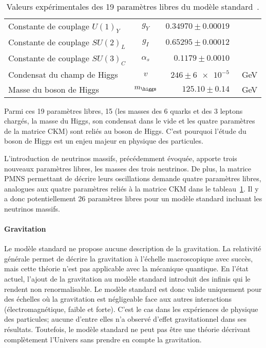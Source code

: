 \begin{table}[h]
\begin{tabular}{lcrl}
Constante de couplage $U(1)_Y$ & $g_Y$ & $\num{0.34970}\pm\num{0.00019}$ & \\
Constante de couplage $SU(2)_L$ & $g_I$ & $\num{0.65295}\pm\num{0.00012}$ & \\
Constante de couplage $SU(3)_C$ & $\alpha_s$ & $\num{0.1179}\pm\num{0.0010}$ & \\
Condensat du champ de Higgs & $v$ & $\num{246}\pm\num{6e-5}$ & \SI{}{\GeV} \\
Masse du boson de Higgs & $m_{\higgs}$ & $\num{125.10}\pm\num{0.14}$ & \SI{}{\GeV} \\
\bottomrule
\end{tabular}
\caption[Valeurs expérimentales des 19 paramètres libres du modèle standard.]{Valeurs expérimentales des 19 paramètres libres du modèle standard~\cite{PDG_booklet_2020}.}
\label{tab-19_free_SM_parameters}
\end{table}
Parmi ces 19 paramètres libres, 15 (les masses des 6 quarks et des 3 leptons chargés, la masse du Higgs, son condensat dans le vide et les quatre paramètres de la matrice CKM) sont reliés au boson de Higgs. C'est pourquoi l'étude du boson de Higgs est un enjeu majeur en physique des particules.
\par L'introduction de neutrinos massifs, précédemment évoquée, apporte trois nouveaux paramètres libres, les masses des trois neutrinos. De plus, la matrice PMNS permettant de décrire leurs oscillations demande quatre paramètres libres, analogues aux quatre paramètres reliés à la matrice CKM dans le tableau~\ref{tab-19_free_SM_parameters}. Il y a donc potentiellement 26 paramètres libres pour un modèle standard incluant les neutrinos massifs.
\paragraph{Gravitation}
Le modèle standard ne propose aucune description de la gravitation.
La relativité générale permet de décrire la gravitation à l'échelle macroscopique avec succès, mais cette théorie n'est pas applicable avec la mécanique quantique.
En l'état actuel, l'ajout de la gravitation au modèle standard introduit des infinis qui le rendent non renormalisable.
Le modèle standard est donc valide uniquement pour des échelles où la gravitation est négligeable face aux autres interactions (électromagnétique, faible et forte).
C'est le cas dans les expériences de physique des particules; aucune d'entre elles n'a observé d'effet gravitationnel dans ses résultats.
Toutefois, le modèle standard ne peut pas être une théorie décrivant complètement l'Univers sans prendre en compte la gravitation.
